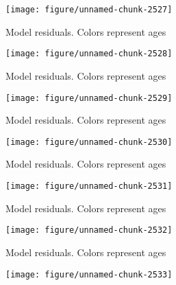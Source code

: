 \documentclass[a4paper]{article}\usepackage{graphicx, color}
\makeatletter
\def\maxwidth{ %
  \ifdim\Gin@nat@width>\linewidth
    \linewidth
  \else
    \Gin@nat@width
  \fi
}
\newenvironment{knitrout}{}{} %
\makeatother
\begin{document}
\begin{knitrout}
\begin{figure}[H]
{\centering \texttt{[image: figure/unnamed-chunk-2527]} 

}

\caption[Model residuals]{Model residuals. Colors represent ages\label{fig:unnamed-chunk-2527}}
\end{figure}
\begin{figure}[H]


{\centering \texttt{[image: figure/unnamed-chunk-2528]} 

}

\caption[Model residuals]{Model residuals. Colors represent ages\label{fig:unnamed-chunk-2528}}
\end{figure}
\begin{figure}[H]


{\centering \texttt{[image: figure/unnamed-chunk-2529]} 

}

\caption[Model residuals]{Model residuals. Colors represent ages\label{fig:unnamed-chunk-2529}}
\end{figure}
\begin{figure}[H]


{\centering \texttt{[image: figure/unnamed-chunk-2530]} 

}

\caption[Model residuals]{Model residuals. Colors represent ages\label{fig:unnamed-chunk-2530}}
\end{figure}
\begin{figure}[H]


{\centering \texttt{[image: figure/unnamed-chunk-2531]} 

}

\caption[Model residuals]{Model residuals. Colors represent ages\label{fig:unnamed-chunk-2531}}
\end{figure}
\begin{figure}[H]


{\centering \texttt{[image: figure/unnamed-chunk-2532]} 

}

\caption[Model residuals]{Model residuals. Colors represent ages\label{fig:unnamed-chunk-2532}}
\end{figure}
\begin{figure}[H]


{\centering \texttt{[image: figure/unnamed-chunk-2533]} 

}


\end{figure}
\end{knitrout}
\end{document}
